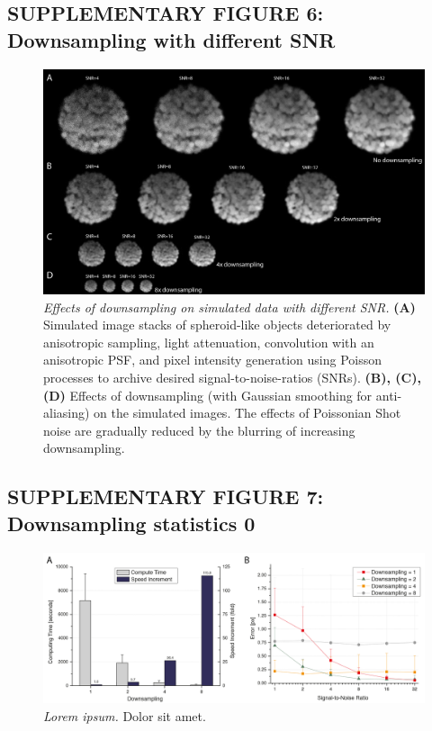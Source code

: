 \documentclass[]{spie}  %
\begin{document}
\subsection*{SUPPLEMENTARY FIGURE 6: Downsampling with different SNR}
\vspace{1mm}
\begin{figure}[h!]
\includegraphics[width=\textwidth]{fig-downsampling.png}
\vspace{-2.0mm}
\caption{\hspace{-0.5mm} \emph{Effects of downsampling on simulated data with different SNR.} \textbf{(A)} Simulated image stacks of spheroid-like objects deteriorated by anisotropic sampling, light attenuation, convolution with an anisotropic PSF, and pixel intensity generation using Poisson processes to archive desired signal-to-noise-ratios (SNRs). \textbf{(B), (C), (D)} Effects of downsampling (with Gaussian smoothing for anti-aliasing) on the simulated images. The effects of Poissonian Shot noise are gradually reduced by the blurring of increasing downsampling.
}
\label{fig:sup-fig-downsampling}
\end{figure}

\pagebreak

\subsection*{SUPPLEMENTARY FIGURE 7: Downsampling statistics 0}
\vspace{1mm}
\begin{figure}[h!]
\includegraphics[width=\textwidth]{fig-downsampling-statistics-0.png}
\vspace{-2.0mm}
\caption{\hspace{-0.5mm} \emph{Lorem ipsum.} Dolor sit amet.
}
\label{fig:sup-fig-downsampling-statistics-0}
\end{figure}
\end{document}
